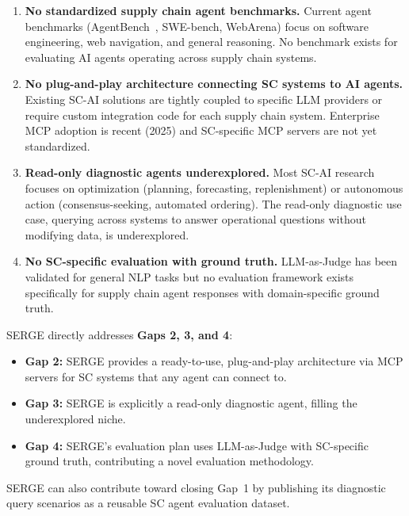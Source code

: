 \documentclass[12pt,a4paper]{report}
\begin{document}
\begin{enumerate}[itemsep=0.5em]
    \item \textbf{No standardized supply chain agent benchmarks.} Current agent benchmarks (AgentBench~\cite{agentbench2024}, SWE-bench, WebArena) focus on software engineering, web navigation, and general reasoning. No benchmark exists for evaluating AI agents operating across supply chain systems.

    \item \textbf{No plug-and-play architecture connecting SC systems to AI agents.} Existing SC-AI solutions are tightly coupled to specific LLM providers or require custom integration code for each supply chain system. Enterprise MCP adoption is recent (2025) and SC-specific MCP servers are not yet standardized.

    \item \textbf{Read-only diagnostic agents underexplored.} Most SC-AI research focuses on optimization (planning, forecasting, replenishment) or autonomous action (consensus-seeking, automated ordering). The read-only diagnostic use case, querying across systems to answer operational questions without modifying data, is underexplored.

    \item \textbf{No SC-specific evaluation with ground truth.} LLM-as-Judge has been validated for general NLP tasks but no evaluation framework exists specifically for supply chain agent responses with domain-specific ground truth.
\end{enumerate}

SERGE directly addresses \textbf{Gaps 2, 3, and 4}:
\begin{itemize}[itemsep=0.3em]
    \item \textbf{Gap 2:} SERGE provides a ready-to-use, plug-and-play architecture via MCP servers for SC systems that any agent can connect to.
    \item \textbf{Gap 3:} SERGE is explicitly a read-only diagnostic agent, filling the underexplored niche.
    \item \textbf{Gap 4:} SERGE's evaluation plan uses LLM-as-Judge with SC-specific ground truth, contributing a novel evaluation methodology.
\end{itemize}

SERGE can also contribute toward closing Gap~1 by publishing its diagnostic query scenarios as a reusable SC agent evaluation dataset.

\end{document}
